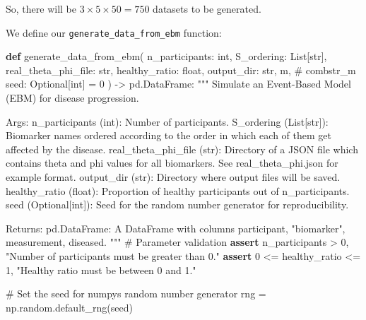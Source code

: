 \documentclass[
  letterpaper,
  DIV=11,
  numbers=noendperiod]{scrreprt}
\newenvironment{Shaded}{\begin{snugshade}}{\end{snugshade}}
\newcommand{\BuiltInTok}[1]{\textcolor[rgb]{0.00,0.23,0.31}{#1}}
\newcommand{\CommentTok}[1]{\textcolor[rgb]{0.37,0.37,0.37}{#1}}
\newcommand{\ControlFlowTok}[1]{\textcolor[rgb]{0.00,0.23,0.31}{\textbf{#1}}}
\newcommand{\DecValTok}[1]{\textcolor[rgb]{0.68,0.00,0.00}{#1}}
\newcommand{\KeywordTok}[1]{\textcolor[rgb]{0.00,0.23,0.31}{\textbf{#1}}}
\newcommand{\NormalTok}[1]{\textcolor[rgb]{0.00,0.23,0.31}{#1}}
\newcommand{\OperatorTok}[1]{\textcolor[rgb]{0.37,0.37,0.37}{#1}}
\newcommand{\StringTok}[1]{\textcolor[rgb]{0.13,0.47,0.30}{#1}}
\begin{document}
So, there will be \(3 \times 5 \times 50 = 750\) datasets to be
generated.

We define our \texttt{generate\_data\_from\_ebm} function:

\begin{Shaded}
\begin{Highlighting}[]
\KeywordTok{def}\NormalTok{ generate\_data\_from\_ebm(}
\NormalTok{    n\_participants: }\BuiltInTok{int}\NormalTok{,}
\NormalTok{    S\_ordering: List[}\BuiltInTok{str}\NormalTok{],}
\NormalTok{    real\_theta\_phi\_file: }\BuiltInTok{str}\NormalTok{,}
\NormalTok{    healthy\_ratio: }\BuiltInTok{float}\NormalTok{,}
\NormalTok{    output\_dir: }\BuiltInTok{str}\NormalTok{,}
\NormalTok{    m,  }\CommentTok{\# combstr\_m}
\NormalTok{    seed: Optional[}\BuiltInTok{int}\NormalTok{] }\OperatorTok{=} \DecValTok{0}
\NormalTok{) }\OperatorTok{{-}\textgreater{}}\NormalTok{ pd.DataFrame:}
    \CommentTok{"""}
\CommentTok{    Simulate an Event{-}Based Model (EBM) for disease progression.}

\CommentTok{    Args:}
\CommentTok{    n\_participants (int): Number of participants.}
\CommentTok{    S\_ordering (List[str]): Biomarker names ordered according to the order }
\CommentTok{        in which each of them get affected by the disease.}
\CommentTok{    real\_theta\_phi\_file (str): Directory of a JSON file which contains }
\CommentTok{        theta and phi values for all biomarkers.}
\CommentTok{        See real\_theta\_phi.json for example format.}
\CommentTok{    output\_dir (str): Directory where output files will be saved.}
\CommentTok{    healthy\_ratio (float): Proportion of healthy participants out of n\_participants.}
\CommentTok{    seed (Optional[int]): Seed for the random number generator for reproducibility.}

\CommentTok{    Returns:}
\CommentTok{    pd.DataFrame: A DataFrame with columns \textquotesingle{}participant\textquotesingle{}, "biomarker", \textquotesingle{}measurement\textquotesingle{}, }
\CommentTok{        \textquotesingle{}diseased\textquotesingle{}.}
\CommentTok{    """}
    \CommentTok{\# Parameter validation}
    \ControlFlowTok{assert}\NormalTok{ n\_participants }\OperatorTok{\textgreater{}} \DecValTok{0}\NormalTok{, }\StringTok{"Number of participants must be greater than 0."}
    \ControlFlowTok{assert} \DecValTok{0} \OperatorTok{\textless{}=}\NormalTok{ healthy\_ratio }\OperatorTok{\textless{}=} \DecValTok{1}\NormalTok{, }\StringTok{"Healthy ratio must be between 0 and 1."}

    \CommentTok{\# Set the seed for numpy\textquotesingle{}s random number generator}
\NormalTok{    rng }\OperatorTok{=}\NormalTok{ np.random.default\_rng(seed)}


\end{Highlighting}
\end{Shaded}
\end{document}
